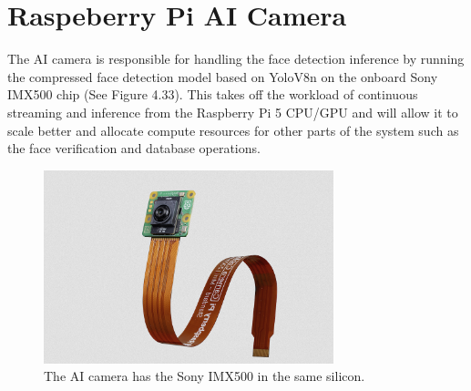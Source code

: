 \section{Raspeberry Pi AI Camera}
The AI camera is responsible for handling the face detection inference by running the compressed face detection model based on YoloV8n on the onboard Sony IMX500 chip (See Figure 4.33). This takes off the workload of continuous streaming and inference from the Raspberry Pi 5 CPU/GPU and will allow it to scale better and allocate compute resources for other parts of the system such as the face verification and database operations.
\begin{figure}[h] %
	\centering
	\includegraphics[width=0.75\textwidth]{figures/chapter4/ai_cam.png} %
	\caption{The AI camera has the Sony IMX500 in the same silicon.}
	\label{fig:ai_cam}
\end{figure}
